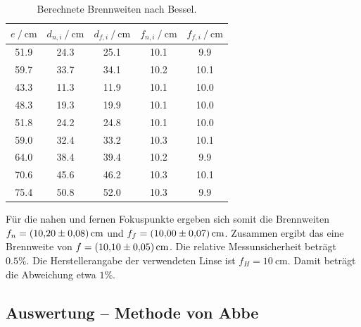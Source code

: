 \begin{table}
    \centering
    \caption{Berechnete Brennweiten nach Bessel.}
    \begin{tabular}{c c c c c}
        \toprule
        {$e \:/\: \si{\centi\meter}$} & {$d_{n,i} \:/\: \si{\centi\meter}$} & {$d_{f,i} \:/\: \si{\centi\meter}$} & {$f_{n,i} \:/\: \si{\centi\meter}$} & {$f_{f,i} \:/\: \si{\centi\meter}$} \\
        \midrule
        51.9 &	24.3 &	25.1 &	10.1 &	9.9   \\
        59.7 &	33.7 &	34.1 &	10.2 &	10.1  \\
        43.3 &	11.3 &	11.9 &	10.1 &	10.0  \\
        48.3 &	19.3 &	19.9 &	10.1 &	10.0  \\
        51.8 &	24.2 &	24.8 &	10.1 &	10.0  \\
        59.0 &	32.4 &	33.2 &	10.3 &	10.1  \\
        64.0 &	38.4 &	39.4 &	10.2 &	9.9   \\
        70.6 &	45.6 &	46.2 &	10.3 &	10.1  \\
        75.4 &	50.8 &	52.0 &	10.3 &	9.9   \\
    \end{tabular}
    \label{tab:bessel}
\end{table}
Für die nahen und fernen Fokuspunkte ergeben sich somit die Brennweiten $f_n = \SI{10.20\pm0.08}{\centi\meter}$ und $f_f = \SI{10.00\pm0.07}{\centi\meter}$.
Zusammen ergibt das eine Brennweite von $f = \SI{10.10\pm0.05}{\centi\meter}$. Die relative Messunsicherheit beträgt $0.5\%$.
Die Herstellerangabe der verwendeten Linse ist $f_H = \SI{10}{\centi\meter}$. Damit beträgt die Abweichung etwa $1\%$.

\subsection{Auswertung -- Methode von Abbe}

